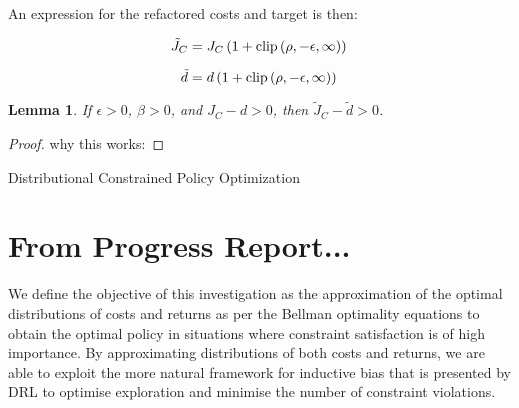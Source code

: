 \documentclass[12pt,twoside]{report}
\newtheorem{lemma}[theorem]{Lemma}
\begin{document}
\noindent An expression for the refactored costs and target is then: 

\begin{equation}
\tilde{J}_{C} = J_C \left( 1 + \textrm{clip} \left( \rho, -\epsilon, \infty \right) \right) \\
\end{equation}

\begin{equation}
\tilde{d} =  d  \left( 1 + \textrm{clip} \left( \rho, -\epsilon, \infty \right) \right) \\
\end{equation}

\begin{lemma}
If $\epsilon > 0$, $\beta > 0$, and $J_{C} - d > 0$, then $\tilde{J}_{C} - \tilde{d} > 0$.
\end{lemma}

\begin{proof}  
why this works:
\end{proof}

\begin{algorithm}[hbt!]
\caption{Distributional Constrained Policy Optimization}\label{alg:dcpo}
\end{algorithm}

\section{From Progress Report...}
We define the objective of this investigation as the approximation of the optimal distributions of costs and returns as per the Bellman optimality equations to obtain the optimal policy in situations where constraint satisfaction is of high importance. By approximating distributions of both costs and returns, we are able to exploit the more natural framework for inductive bias \cite{distributional-perspective} that is presented by DRL to optimise exploration and minimise the number of constraint violations. 
\end{document}
